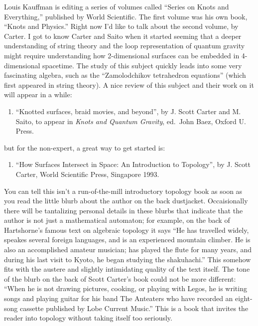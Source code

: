 \documentclass{article}
\def\tightlist{}
\begin{document}
Louis Kauffman is editing a series of volumes called ``Series on Knots
and Everything,'' published by World Scientific. The first volume was
his own book, ``Knots and Physics.'' Right now I'd like to talk about
the second volume, by Carter. I got to know Carter and Saito when it
started seeming that a deeper understanding of string theory and the
loop representation of quantum gravity might require understanding how
2-dimensional surfaces can be embedded in 4-dimensional spacetime. The
study of this subject quickly leads into some very fascinating algebra,
such as the ``Zamolodchikov tetrahedron equations'' (which first
appeared in string theory). A nice review of this subject and their work
on it will appear in a while:

\begin{enumerate}
\def\labelenumi{\arabic{enumi})}
\tightlist
\item
  ``Knotted surfaces, braid movies, and beyond'', by J. Scott Carter and
  M. Saito, to appear in \emph{Knots and Quantum Gravity}, ed.~John
  Baez, Oxford U. Press.
\end{enumerate}

but for the non-expert, a great way to get started is:

\begin{enumerate}
\def\labelenumi{\arabic{enumi})}
\setcounter{enumi}{1}
\tightlist
\item
  ``How Surfaces Intersect in Space: An Introduction to Topology'', by
  J. Scott Carter, World Scientific Press, Singapore 1993.
\end{enumerate}

You can tell this isn't a run-of-the-mill introductory topology book as
soon as you read the little blurb about the author on the back
dustjacket. Occaisionally there will be tantalizing personal details in
these blurbs that indicate that the author is not just a mathematical
automaton; for example, on the back of Hartshorne's famous text on
algebraic topology it says ``He has travelled widely, speakes several
foreign languages, and is an experienced mountain climber. He is also an
accomplished amateur musician; has played the flute for many years, and
during his last visit to Kyoto, he began studying the shakuhachi.'' This
somehow fits with the austere and slightly intimidating quality of the
text itself. The tone of the blurb on the back of Scott Carter's book
could not be more different: ``When he is not drawing pictures, cooking,
or playing with Legos, he is writing songs and playing guitar for his
band The Anteaters who have recorded an eight-song cassette published by
Lobe Current Music.'' This is a book that invites the reader into
topology without taking itself too seriously.
\end{document}
